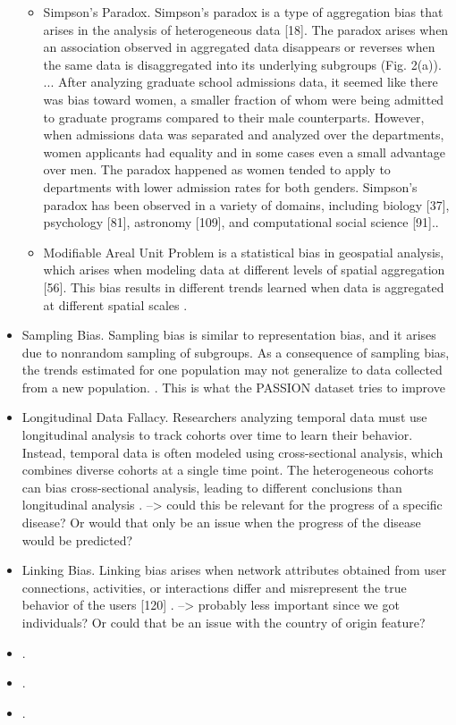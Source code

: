 \documentclass[12pt, a4paper, oneside]{book}   	%
\begin{document}
\begin{itemize}
				\begin{itemize}
					\item Simpson’s Paradox. Simpson’s paradox is a type of aggregation bias that arises in the analysis of heterogeneous data [18]. The paradox arises when an association observed in aggregated data disappears or reverses when the same data is disaggregated into its underlying subgroups (Fig. 2(a)). ... After analyzing graduate school admissions data, it seemed like there was bias toward women, a smaller fraction of whom were being admitted to graduate programs compared to their male counterparts. However, when admissions data was separated and analyzed over the departments, women applicants had equality and in some cases even a small advantage over men. The paradox happened as women tended to apply to departments with lower admission rates for both genders. Simpson’s paradox has been observed in a variety of domains, including biology [37], psychology [81], astronomy [109], and computational social science [91].\autocite{Mehrabi_2021}.	
					\item Modifiable Areal Unit Problem is a statistical bias in geospatial analysis, which arises when modeling data at different levels of spatial aggregation [56]. This bias results in different trends learned when data is aggregated at different spatial scales \autocite{Mehrabi_2021}.
				\end{itemize}
				\item Sampling Bias. Sampling bias is similar to representation bias, and it arises due to nonrandom sampling of subgroups. As a consequence of sampling bias, the trends estimated for one population may not generalize to data collected from a new population. \autocite{Mehrabi_2021}. This is what the PASSION dataset tries to improve
				\item Longitudinal Data Fallacy. Researchers analyzing temporal data must use longitudinal analysis to track cohorts over time to learn their behavior. Instead, temporal data is often modeled using cross-sectional analysis, which combines diverse cohorts at a single time point. The heterogeneous cohorts can bias cross-sectional analysis, leading to different conclusions than longitudinal analysis \autocite{Mehrabi_2021}. --> could this be relevant for the progress of a specific disease? Or would that only be an issue when the progress of the disease would be predicted?
				\item Linking Bias. Linking bias arises when network attributes obtained from user connections, activities, or interactions differ and misrepresent the true behavior of the users [120] \autocite{Mehrabi_2021}. --> probably less important since we got individuals? Or could that be an issue with the country of origin feature?
				\item \autocite{Mehrabi_2021}.
				\item \autocite{Mehrabi_2021}.
				\item \autocite{Mehrabi_2021}.
			\end{itemize}	
			
\end{document}

